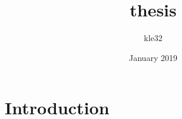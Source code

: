 \documentclass{article}
\title{thesis}
\author{kle32 }
\date{January 2019}
\begin{document}
\maketitle

\section{Introduction}
\end{document}
